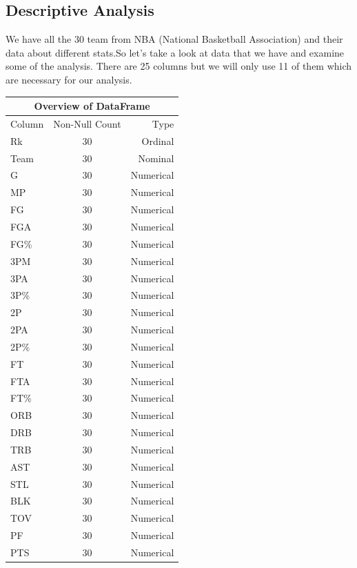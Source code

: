 \documentclass[conference]{IEEEtran}
\begin{document}
\subsection{Descriptive Analysis }
We have all the 30 team from NBA (National Basketball Association) and their data about different stats.So let’s take a look at data  that we have and examine some of the analysis.
There are 25 columns but we will only use 11 of them which are necessary for our analysis.
\vspace{\baselineskip}
\vspace{\baselineskip}

\vspace{\baselineskip}
\vspace{\baselineskip}
\begin{tabular}{|l||c|r|}
    \hline
    \multicolumn{3}{|c|}{Overview of DataFrame} \\
    \hline
    Column & Non-Null Count & Type \\
    \hline
    Rk & 30 & Ordinal \\
    Team & 30 & Nominal \\
    G & 30 & Numerical \\
    MP & 30 & Numerical \\
    FG & 30 & Numerical \\
    FGA & 30 & Numerical \\
    FG\% & 30 & Numerical \\
    3PM & 30 & Numerical \\
    3PA & 30 & Numerical \\
    3P\% & 30 & Numerical \\
    2P & 30 & Numerical \\
    2PA & 30 & Numerical \\
    2P\% & 30 & Numerical \\
    FT & 30 & Numerical \\
    FTA & 30 & Numerical \\
    FT\% & 30 & Numerical \\
    ORB & 30 & Numerical \\
    DRB & 30 & Numerical \\
    TRB & 30 & Numerical \\
    AST & 30 & Numerical \\
    STL & 30 & Numerical \\
    BLK & 30 & Numerical \\
    TOV & 30 & Numerical \\
    PF & 30 & Numerical \\
    PTS & 30 & Numerical \\
    \hline
\end{tabular}
\end{document}
